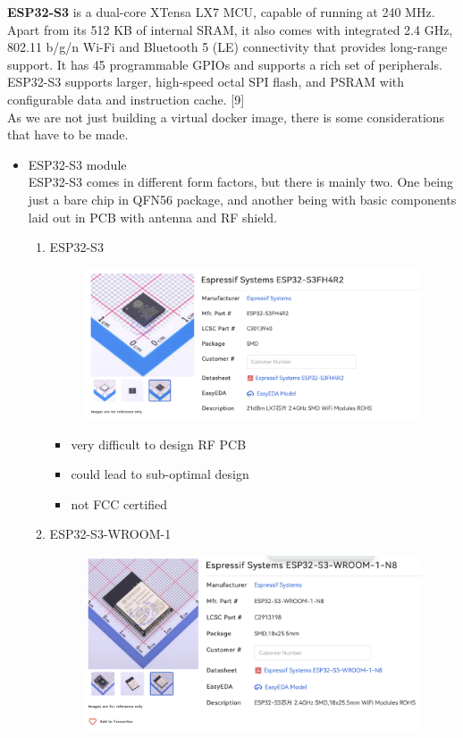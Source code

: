 \documentclass[conference]{IEEEtran}
\begin{document}
\textbf{ESP32-S3} is a dual-core XTensa LX7 MCU, capable of running at 240 MHz. Apart from its 512 KB of internal SRAM, it also comes with integrated 2.4 GHz, 802.11 b/g/n Wi-Fi and Bluetooth 5 (LE) connectivity that provides long-range support. It has 45 programmable GPIOs and supports a rich set of peripherals. ESP32-S3 supports larger, high-speed octal SPI flash, and PSRAM with configurable data and instruction cache. [9]\\
As we are not just building a virtual docker image, there is some considerations that have to be made.\\

\begin{itemize}
\item ESP32-S3 module\\
ESP32-S3 comes in different form factors, but there is mainly two. One being just a bare chip in QFN56 package, and another being with basic components laid out in PCB with antenna and RF shield. \\
\begin{enumerate}[label=\arabic*.]
\item ESP32-S3
\begin{figure}[H]\centering \includegraphics[scale=0.25]{images/esp32-s3.png}\end{figure}
\begin{itemize}
\item very difficult to design RF PCB\\
\item could lead to sub-optimal design\\
\item not FCC certified\\
\end{itemize}
\item ESP32-S3-WROOM-1
\begin{figure}[H]\centering \includegraphics[scale=0.25]{images/esp32-s3-wroom-1.png}\end{figure}

\end{enumerate}
\end{itemize}
\end{document}
